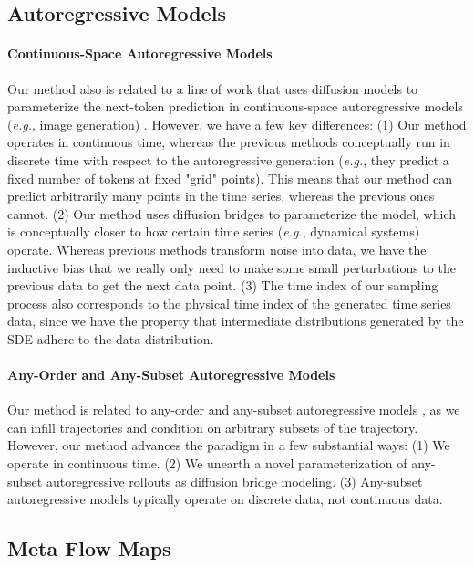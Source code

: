\subsection{Autoregressive Models}

\paragraph{Continuous-Space Autoregressive Models}
Our method also is related to a line of work that uses diffusion models to parameterize the next-token prediction in continuous-space autoregressive models (\textit{e.g.}, image generation) \cite{li2024autoregressive, ho2022cascaded}. However, we have a few key differences:
(1) Our method operates in continuous time, whereas the previous methods conceptually run in discrete time with respect to the autoregressive generation (\textit{e.g.}, they predict a fixed number of tokens at fixed "grid" points). This means that our method can predict arbitrarily many points in the time series, whereas the previous ones cannot.
(2) Our method uses diffusion bridges to parameterize the model, which is conceptually closer to how certain time series (\textit{e.g.}, dynamical systems) operate. Whereas previous methods transform noise into data, we have the inductive bias that we really only need to make some small perturbations to the previous data to get the next data point.
(3) The time index of our sampling process also corresponds to the physical time index of the generated time series data, since we have the property that intermediate distributions generated by the SDE adhere to the data distribution.

\paragraph{Any-Order and Any-Subset Autoregressive Models}
Our method is related to any-order and any-subset autoregressive models \cite{shih2022training, guo2025reviving}, as we can infill trajectories and condition on arbitrary subsets of the trajectory. However, our method advances the paradigm in a few substantial ways: (1) We operate in continuous time. (2) We unearth a novel parameterization of any-subset autoregressive rollouts as diffusion bridge modeling. (3) Any-subset autoregressive models typically operate on discrete data, not continuous data.

\subsection{Meta Flow Maps}

